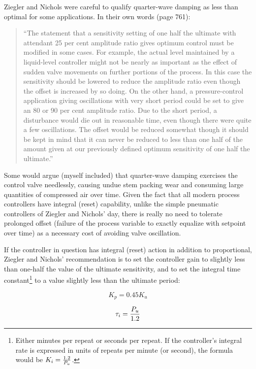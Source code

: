 \filbreak

Ziegler and Nichols were careful to qualify quarter-wave damping as less than optimal for some applications.  In their own words (page 761):

\begin{quote}
``The statement that a sensitivity setting of one half the ultimate with attendant 25 per cent amplitude ratio gives optimum control must be modified in some cases.  For example, the actual level maintained by a liquid-level controller might not be nearly as important as the effect of sudden valve movements on further portions of the process.  In this case the sensitivity should be lowered to reduce the amplitude ratio even though the offset is increased by so doing.  On the other hand, a pressure-control application giving oscillations with very short period could be set to give an 80 or 90 per cent amplitude ratio.  Due to the short period, a disturbance would die out in reasonable time, even though there were quite a few oscillations.  The offset would be reduced somewhat though it should be kept in mind that it can never be reduced to less than one half of the amount given at our previously defined optimum sensitivity of one half the ultimate.''
\end{quote}

Some would argue (myself included) that quarter-wave damping exercises the control valve needlessly, causing undue stem packing wear and consuming large quantities of compressed air over time.  Given the fact that all modern process controllers have integral (reset) capability, unlike the simple pneumatic controllers of Ziegler and Nichols' day, there is really no need to tolerate prolonged offset (failure of the process variable to exactly equalize with setpoint over time) as a necessary cost of avoiding valve oscillation.

\filbreak

If the controller in question has integral (reset) action in addition to proportional, Ziegler and Nichols' recommendation is to set the controller gain to slightly less than one-half the value of the ultimate sensitivity, and to set the integral time constant\footnote{Either minutes per repeat or seconds per repeat.  If the controller's integral rate is expressed in units of repeats per minute (or second), the formula would be $K_i = {1.2 \over P_u}$.} to a value slightly less than the ultimate period:

$$K_p = 0.45 K_u$$

$$\tau_i = {P_u \over 1.2}$$


